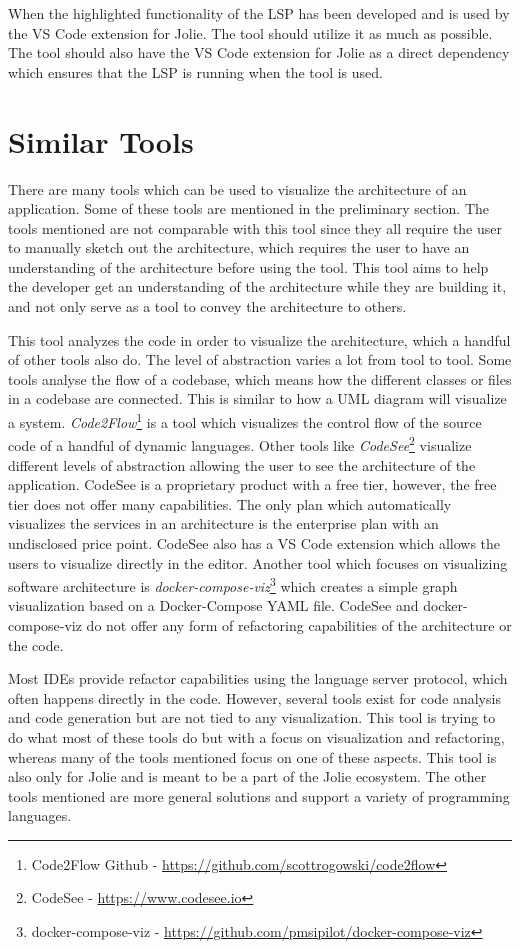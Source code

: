 When the highlighted functionality of the LSP has been developed and is used by the VS Code extension for Jolie. The tool should utilize it as much as possible.
The tool should also have the VS Code extension for Jolie as a direct dependency which ensures that the LSP is running when the tool is used.

\section{Similar Tools}
There are many tools which can be used to visualize the architecture of an application. Some of these tools are mentioned in the preliminary section.
The tools mentioned are not comparable with this tool since they all require the user to manually sketch out the architecture, which requires the user to have an understanding of the architecture before using the tool.
This tool aims to help the developer get an understanding of the architecture while they are building it, and not only serve as a tool to convey the architecture to others.

This tool analyzes the code in order to visualize the architecture, which a handful of other tools also do. 
The level of abstraction varies a lot from tool to tool. Some tools analyse the flow of a codebase, which means how the different classes or files in 
a codebase are connected. This is similar to how a UML diagram will visualize a system. \textit{Code2Flow}\footnote{Code2Flow Github - \url{https://github.com/scottrogowski/code2flow}} is a tool which visualizes the control flow of the source code of a handful of dynamic languages. Other tools like \textit{CodeSee}\footnote{CodeSee - \url{https://www.codesee.io}} visualize different levels of abstraction allowing the user to see the architecture of the application.
CodeSee is a proprietary product with a free tier, however, the free tier does not offer many capabilities.
The only plan which automatically visualizes the services in an architecture is the enterprise plan with an undisclosed price point. 
CodeSee also has a VS Code extension which allows the users to visualize directly in the editor. Another tool which focuses on visualizing software architecture 
is \textit{docker-compose-viz}\footnote{docker-compose-viz - \url{https://github.com/pmsipilot/docker-compose-viz}} which creates a simple graph visualization based on a Docker-Compose YAML file.
CodeSee and docker-compose-viz do not offer any form of refactoring capabilities of the architecture or the code.

Most IDEs provide refactor capabilities using the language server protocol, which often happens directly in the code.
However, several tools exist for code analysis and code generation but are not tied to any visualization.
This tool is trying to do what most of these tools do but with a focus on visualization and refactoring, whereas many of the tools mentioned focus on one of these aspects.
This tool is also only for Jolie and is meant to be a part of the Jolie ecosystem. The other tools mentioned are more general solutions and support a variety of programming languages.

